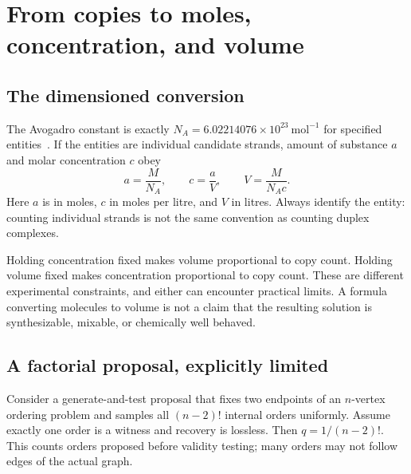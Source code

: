 \section{From copies to moles, concentration, and volume}

\subsection{The dimensioned conversion}

The Avogadro constant is exactly $N_A=6.02214076\times10^{23}\ \mathrm{mol}^{-1}$ for specified entities~\cite{BIPMmole}. If the entities are individual candidate strands, amount of substance $a$ and molar concentration $c$ obey
\begin{equation}
a=\frac{M}{N_A},\qquad c=\frac{a}{V},\qquad V=\frac{M}{N_Ac}. \label{eq:volume}
\end{equation}
Here $a$ is in moles, $c$ in moles per litre, and $V$ in litres. Always identify the entity: counting individual strands is not the same convention as counting duplex complexes.


Holding concentration fixed makes volume proportional to copy count. Holding volume fixed makes concentration proportional to copy count. These are different experimental constraints, and either can encounter practical limits. A formula converting molecules to volume is not a claim that the resulting solution is synthesizable, mixable, or chemically well behaved.

\subsection{A factorial proposal, explicitly limited}

Consider a generate-and-test proposal that fixes two endpoints of an $n$-vertex ordering problem and samples all $(n-2)!$ internal orders uniformly. Assume exactly one order is a witness and recovery is lossless. Then $q=1/(n-2)!$. This counts orders proposed before validity testing; many orders may not follow edges of the actual graph.

